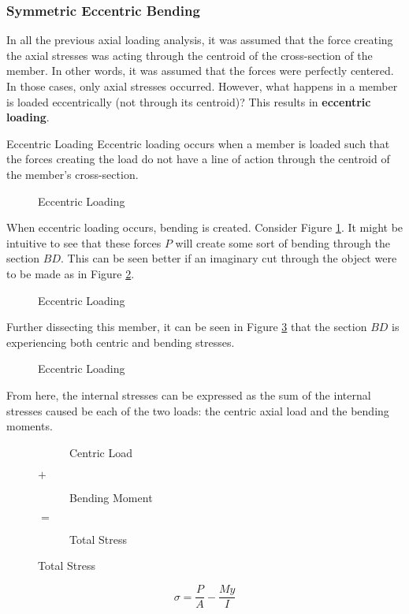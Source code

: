 \documentclass[12pt]{article}
\begin{document}
\subsubsection{Symmetric Eccentric Bending}
\label{sssec:symmetricEccentricBending}

In all the previous axial loading analysis, it was assumed that the force creating the axial stresses was acting through the centroid of the cross-section of the member. In other words, it was assumed that the forces were perfectly centered. In those cases, only axial stresses occurred. However, what happens in a member is loaded eccentrically (not through its centroid)? This results in \textbf{eccentric loading}.
\begin{definition}{Eccentric Loading}
  Eccentric loading occurs when a member is loaded such that the forces creating the load do not have a line of action through the centroid of the member's cross-section.
\end{definition}
\begin{figure}[H]
  \centering
  
  \caption{Eccentric Loading}
  \label{fig:066}
\end{figure}
When eccentric loading occurs, bending is created. Consider Figure \ref{fig:066}. It might be intuitive to see that these forces $P$ will create some sort of bending through the section $BD$. This can be seen better if an imaginary cut through the object were to be made as in Figure \ref{fig:067}.
\begin{figure}[H]
  \centering
  
  \caption{Eccentric Loading}
  \label{fig:067}
\end{figure}
Further dissecting this member, it can be seen in Figure \ref{fig:068} that the section $BD$ is experiencing both centric and bending stresses.
\begin{figure}[H]
  \centering
  
  \caption{Eccentric Loading}
  \label{fig:068}
\end{figure}
From here, the internal stresses can be expressed as the sum of the internal stresses caused be each of the two loads: the centric axial load and the bending moments.
\begin{figure}[H]
  \centering
  \begin{subfigure}[H]{0.3\textwidth}
    \centering
    
    \caption{Centric Load}
    \label{fig:069}
  \end{subfigure}
  {\Large \textbf{$+$}}
  \begin{subfigure}[H]{0.3\textwidth}
    \centering
    
    \caption{Bending Moment}
    \label{fig:070}
  \end{subfigure}
  {\Large \textbf{$=$}}
  \begin{subfigure}[H]{0.3\textwidth}
    \centering
    
    \caption{Total Stress}
    \label{fig:071}
  \end{subfigure}
\end{figure}
\begin{equation*}
  \sigma = \frac{P}{A} - \frac{My}{I}
\end{equation*}
\end{document}
